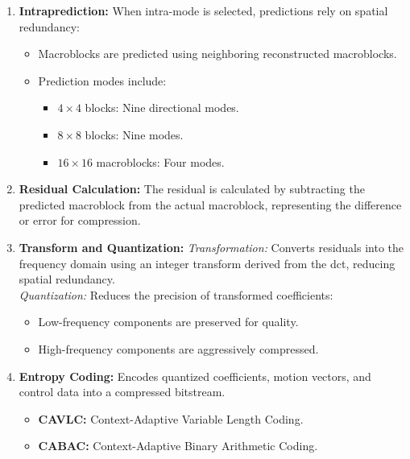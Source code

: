 \documentclass{ioereport}
\begin{document}
\begin{enumerate}[label=\textbf{\roman*.}]
        \item \textbf{Intraprediction:}  
        When intra-mode is selected, predictions rely on spatial redundancy:
        \begin{itemize}
            \item Macroblocks are predicted using neighboring reconstructed macroblocks.
            \item Prediction modes include:
            \begin{itemize}
                \item $4 \times 4$ blocks: Nine directional modes.
                \item $8 \times 8$ blocks: Nine modes.
                \item $16 \times 16$ macroblocks: Four modes.
            \end{itemize}
        \end{itemize}
    
        \item \textbf{Residual Calculation:}  
        The residual is calculated by subtracting the predicted macroblock from the actual macroblock, representing the difference or error for compression.
    
        \item \textbf{Transform and Quantization:}  
        \textit{Transformation:} Converts residuals into the frequency domain using an integer transform derived from the \gls{dct}, reducing spatial redundancy. \\
        \textit{Quantization:} Reduces the precision of transformed coefficients:
        \begin{itemize}
            \item Low-frequency components are preserved for quality.
            \item High-frequency components are aggressively compressed.
        \end{itemize}
    
        \item \textbf{Entropy Coding:}  
        Encodes quantized coefficients, motion vectors, and control data into a compressed bitstream.
        \begin{itemize}
            \item \textbf{CAVLC:} Context-Adaptive Variable Length Coding.
            \item \textbf{CABAC:} Context-Adaptive Binary Arithmetic Coding.
        \end{itemize}
    

\end{enumerate}
\end{document}
